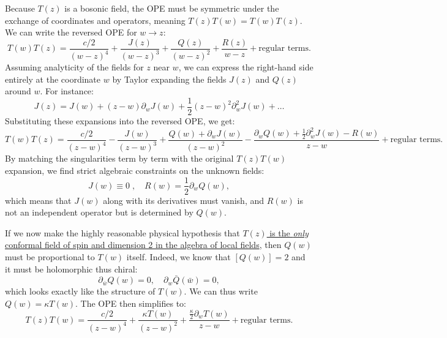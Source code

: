 Because \(T(z)\) is a bosonic field, the OPE must be symmetric under the exchange of coordinates and operators, meaning \(T(z)T(w) = T(w)T(z)\). We can write the reversed OPE for \(w \to z\):
\[
    T(w)T(z) = \frac{c/2}{(w-z)^4} + \frac{J(z)}{(w-z)^3} + \frac{Q(z)}{(w-z)^2} + \frac{R(z)}{w-z} + \text{regular terms}.
\]
Assuming analyticity of the fields for \(z\) near \(w\), we can express the right-hand side entirely at the coordinate \(w\) by Taylor expanding the fields \(J(z)\) and \(Q(z)\) around \(w\). For instance:
\[
    J(z) = J(w) + (z-w)\partial_w J(w) + \frac{1}{2}(z-w)^2 \partial_w^2 J(w) + \dots
\]
Substituting these expansions into the reversed OPE, we get:
\[
    T(w)T(z) = \frac{c/2}{(z-w)^4} - \frac{J(w)}{(z-w)^3} + \frac{Q(w) + \partial_w J(w)}{(z-w)^2} - \frac{\partial_w Q(w) + \frac{1}{2}\partial_w^2 J(w) - R(w)}{z-w} + \text{regular terms}.
\]
By matching the singularities term by term with the original \(T(z)T(w)\) expansion, we find strict algebraic constraints on the unknown fields:
\[
    J(w) \equiv 0 \;, \quad R(w) = \frac{1}{2}\partial_w Q(w),
\]
which means that \(J(w)\) along with its derivatives must vanish, and \(R(w)\) is not an independent operator but is determined by \(Q(w)\).

If we now make the highly reasonable physical hypothesis that \uline{\(T(z)\) is the \textit{only} conformal field of spin and dimension 2 in the algebra of local fields}, then \(Q(w)\) must be proportional to \(T(w)\) itself. Indeed, we know that \([Q(w)]=2\) and it must be holomorphic thus chiral:
\[
    \partial_{\bar{w}} Q(w) = 0, \quad \partial_w \bar{Q}(\bar{w}) = 0,
\]
which looks exactly like the structure of \(T(w)\). We can thus write \(Q(w) = \kappa T(w)\). The OPE then simplifies to:
\[
    T(z)T(w) = \frac{c/2}{(z-w)^4} + \frac{\kappa T(w)}{(z-w)^2} + \frac{\frac{\kappa}{2} \partial_w T(w)}{z-w} + \text{regular terms}.
\]

